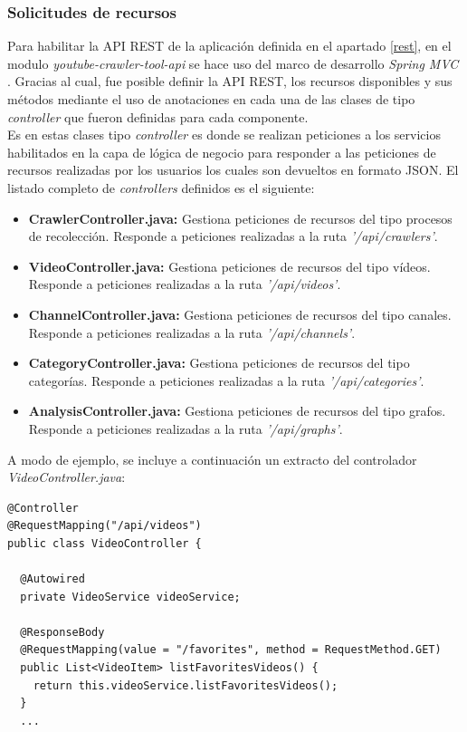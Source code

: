 \documentclass[11pt,a4paper]{article}
\begin{document}
\subsubsection{Solicitudes de recursos}
Para habilitar la API REST de la aplicación definida en el apartado \ref{rest}, en el modulo \textit{youtube-crawler-tool-api} se hace uso del marco de desarrollo \textit{Spring MVC} \cite{46}. Gracias al cual, fue posible definir la API REST, los recursos disponibles y sus métodos mediante el uso de anotaciones en cada una de las clases de tipo \textit{controller} que fueron definidas para cada componente.
\\

Es en estas clases tipo \textit{controller} es donde se realizan peticiones a los servicios habilitados en la capa de lógica de negocio para responder a las peticiones de recursos realizadas por los usuarios los cuales son devueltos en formato JSON. El listado completo de \textit{controllers} definidos es el siguiente:

\begin{itemize}
\item \textbf{CrawlerController.java:} Gestiona peticiones de recursos del tipo procesos de recolección. Responde a peticiones realizadas a la ruta \textit{'/api/crawlers'}.
\item \textbf{VideoController.java:} Gestiona peticiones de recursos del tipo vídeos. Responde a peticiones realizadas a la ruta \textit{'/api/videos'}.
\item \textbf{ChannelController.java:} Gestiona peticiones de recursos del tipo canales. Responde a peticiones realizadas a la ruta \textit{'/api/channels'}.
\item \textbf{CategoryController.java:} Gestiona peticiones de recursos del tipo categorías. Responde a peticiones realizadas a la ruta \textit{'/api/categories'}.
\item \textbf{AnalysisController.java:} Gestiona peticiones de recursos del tipo grafos. Responde a peticiones realizadas a la ruta \textit{'/api/graphs'}.
\end{itemize}

A modo de ejemplo, se incluye a continuación un extracto del controlador \textit{VideoController.java}:
\begin{lstlisting}[style=C]
@Controller
@RequestMapping("/api/videos")
public class VideoController {
  
  @Autowired
  private VideoService videoService;
  
  @ResponseBody
  @RequestMapping(value = "/favorites", method = RequestMethod.GET)
  public List<VideoItem> listFavoritesVideos() {
    return this.videoService.listFavoritesVideos();
  }
  ...
\end{lstlisting}	
\end{document}
